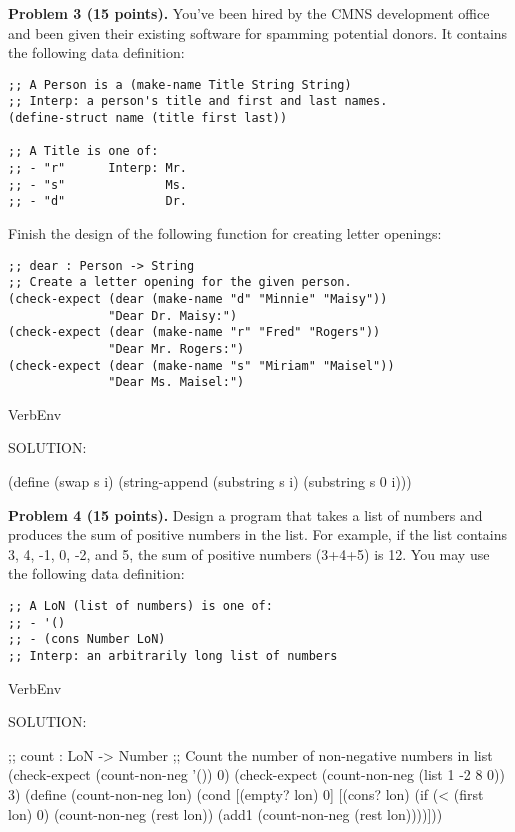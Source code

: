 \documentclass[12pt]{article}
\begin{document}

\newpage

\noindent
{\bf Problem 3 (15 points).}
%
You've been hired by the CMNS development office and been given their
existing software for spamming potential donors.  It contains the following
data definition:
\begin{verbatim}
;; A Person is a (make-name Title String String)
;; Interp: a person's title and first and last names.
(define-struct name (title first last))

;; A Title is one of:
;; - "r"      Interp: Mr.
;; - "s"              Ms.
;; - "d"              Dr.
\end{verbatim}

\noindent
Finish the design of the following function for creating letter
openings:
\begin{verbatim}
;; dear : Person -> String
;; Create a letter opening for the given person.
(check-expect (dear (make-name "d" "Minnie" "Maisy"))
              "Dear Dr. Maisy:")
(check-expect (dear (make-name "r" "Fred" "Rogers"))
              "Dear Mr. Rogers:")
(check-expect (dear (make-name "s" "Miriam" "Maisel"))
              "Dear Ms. Maisel:")
\end{verbatim}


\begin{SaveVerbatim}{VerbEnv}

SOLUTION:

(define (swap s i)
  (string-append (substring s i)
                 (substring s 0 i)))
\end{SaveVerbatim}


\newpage
\noindent
{\bf Problem 4 (15 points).}  
%
Design a program that takes a list of numbers and produces the sum of
positive numbers in the list.  For example, if the list contains 3, 4,
-1, 0, -2, and 5, the sum of positive numbers (3+4+5) is 12.  You may
use the following data definition:

\begin{verbatim}
;; A LoN (list of numbers) is one of:
;; - '()
;; - (cons Number LoN)
;; Interp: an arbitrarily long list of numbers
\end{verbatim}


\begin{SaveVerbatim}{VerbEnv}

SOLUTION:

;; count : LoN -> Number
;; Count the number of non-negative numbers in list
(check-expect (count-non-neg '()) 0)
(check-expect (count-non-neg (list 1 -2 8 0)) 3)
(define (count-non-neg lon)
  (cond [(empty? lon) 0]
        [(cons? lon)
         (if (< (first lon) 0)
             (count-non-neg (rest lon))
             (add1 (count-non-neg (rest lon))))]))
\end{SaveVerbatim}
\end{document}
